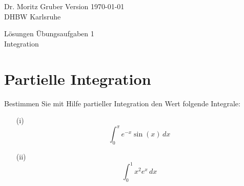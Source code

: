 
\usepackage{stix}



\vspace*{-20mm}
{
	\color{dhbwGray}
	Dr. Moritz Gruber	\hfill Version \today\\
	DHBW Karlsruhe\\
}

\vspace{10mm}
\begin{center}
	{
		{ \LARGE Lösungen Übungsaufgaben 1}\\[3mm]
		{\Large Integration}
	}
\end{center}

\vspace{5mm}




\section{Partielle Integration}
Bestimmen Sie mit Hilfe partieller Integration den Wert folgende Integrale:
\begin{itemize}
	\item[(i)] 
		$$
			\int_0^{\pi} e^{-x}\sin(x)\, dx
		$$
	\item[(ii)]
		$$
			\int_0^1 x^2e^x \, dx
		$$
\end{itemize}

